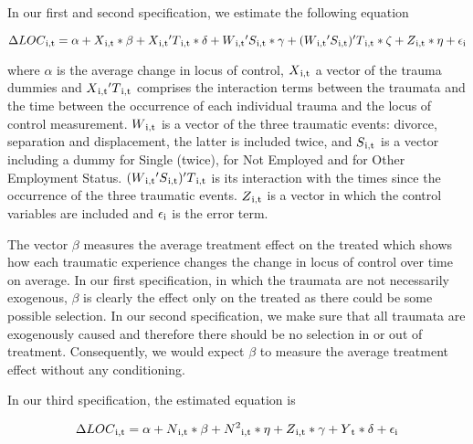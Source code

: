 \documentclass[12pt, a4paper, fleqn, parskip]{scrartcl}
\begin{document}
In our first and second specification, we estimate the following equation

\begin{center}
	$ \Delta LOC \textsubscript{i,t}= \alpha + X \textsubscript{i,t} * \beta  + X \textsubscript{i,t} ' T \textsubscript{i,t} * \delta + W \textsubscript{i,t} ' S \textsubscript{i,t} * \gamma + (W \textsubscript{i,t} ' S \textsubscript{i,t}) ' T \textsubscript{i,t} * \zeta + Z \textsubscript{i,t} * \eta + \epsilon\textsubscript{i}  $
\end{center}

where $\alpha$ is the average change in locus of control, $
X\textsubscript{i,t}$ a vector of the trauma dummies and $ X
\textsubscript{i,t} ' T \textsubscript{i,t}$ comprises the interaction terms
between the traumata and the time between the occurrence of each individual
trauma and the locus of control measurement. $ W \textsubscript{i,t}$ is a
vector of the three traumatic events: divorce, separation and displacement, the
latter is included twice, and $ S \textsubscript{i,t} $ is a vector including a
dummy for Single (twice), for Not Employed and for Other Employment Status. $(W
\textsubscript{i,t} ' S \textsubscript{i,t}) ' T \textsubscript{i,t} $ is its
interaction with the times since the occurrence of the three traumatic events.
$ Z \textsubscript{i,t}$ is a vector in which the control variables are
included and $\epsilon\textsubscript{i}$ is the error term.

The vector $\beta$ measures the average treatment effect on the treated which
shows how each traumatic experience changes the change in locus of control over
time on average. In our first specification, in which the traumata are not
necessarily exogenous, $\beta $ is clearly the effect only on the treated as
there could be some possible selection. In our second specification, we make
sure that all traumata are exogenously caused and therefore there should be no
selection in or out of treatment. Consequently, we would expect $\beta$ to
measure the average treatment effect without any conditioning.

In our third specification, the estimated equation is

\begin{align}
	\Delta LOC \textsubscript{i,t}= \alpha + N \textsubscript{i,t} * \beta + N
	\textsuperscript{2}\textsubscript{i,t} * \eta + Z \textsubscript{i,t} *
	\gamma + Y\textsubscript{t} * \delta + \epsilon\textsubscript{i}
\end{align}
\end{document}
